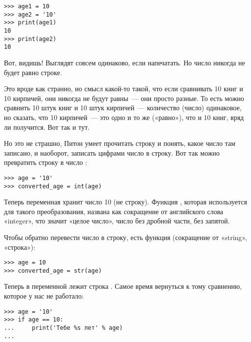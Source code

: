 \begin{listing}
\begin{verbatim}
>>> age1 = 10
>>> age2 = '10'
>>> print(age1)
10
>>> print(age2)
10
\end{verbatim}
\end{listing}

Вот, видишь! Выглядят совсем одинаково, если напечатать. Но число никогда не будет равно строке.

Это вроде как странно, но смысл какой-то такой, что если сравнивать 10 книг и 10 кирпичей, они никогда не будут равны — они просто разные. То есть можно сравнить 10 штук книг и 10 штук кирпичей — количество (число) одинаковое, но сказать, что 10 кирпичей — это одно и то же («равно»), что и 10 книг, вряд ли получится. Вот так и тут.

Но это не страшно, Питон умеет прочитать строку и понять, какое число там записано, и наоборот, записать цифрами число в строку. Вот так можно превратить строку  в число :

\begin{listing}
\begin{verbatim}
>>> age = '10'
>>> converted_age = int(age)
\end{verbatim}
\end{listing}

Теперь переменная  хранит число 10 (не строку). Функция , которая используется для такого преобразования, названа как сокращение от английского слова «integer», что значит «целое число», число без дробной части, без запятой.

Чтобы обратно перевести число в строку, есть функция  (сокращение от «string», «строка»):

\begin{listing}
\begin{verbatim}
>>> age = 10
>>> converted_age = str(age)
\end{verbatim}
\end{listing}

Теперь в переменной  лежит строка . Самое время вернуться к тому сравнению, которое у нас не работало:

\begin{listing}
\begin{verbatim}
>>> age = '10'
>>> if age == 10:
...     print('Тебе %s лет' % age)
...
\end{verbatim}
\end{listing}

